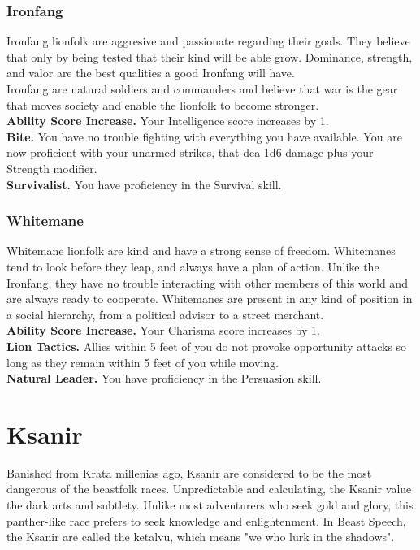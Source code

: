 \documentclass[10pt,twoside,twocolumn,openany]{book}
\begin{document}
\subsubsection{Ironfang}

Ironfang lionfolk are aggresive and passionate regarding their goals. They believe that only by being tested that their kind will be able grow. Dominance, strength, and valor are the best qualities a good Ironfang will have. \\
Ironfang are natural soldiers and commanders and believe that war is the gear that moves society and enable the lionfolk to become stronger.\\
\indent \textbf{Ability Score Increase.} Your Intelligence score increases by 1.\\
\indent \textbf{Bite.} You have no trouble fighting with everything you have available. You are now proficient with your unarmed strikes, that dea 1d6 damage plus your Strength modifier.\\
\indent \textbf{Survivalist.} You have proficiency in the Survival skill.
\subsubsection{Whitemane}
Whitemane lionfolk are kind and have a strong sense of freedom. Whitemanes tend to look before they leap, and always have a plan of action. Unlike the Ironfang, they have no trouble interacting with other members of this world and are always ready to cooperate. Whitemanes are present in any kind of position in a social hierarchy, from a political advisor to a street merchant.\\
\indent \textbf{Ability Score Increase.} Your Charisma score increases by 1.\\
\indent \textbf{Lion Tactics.} Allies within 5 feet of you do not provoke opportunity attacks so long as they remain within 5 feet of you while moving.\\
\indent \textbf{Natural Leader.} You have proficiency in the Persuasion skill.

\newpage

\section{Ksanir}

Banished from Krata millenias ago, Ksanir are considered to be the most dangerous of the beastfolk races. Unpredictable and calculating, the Ksanir value the dark arts and subtlety. Unlike most adventurers who seek gold and glory, this panther-like race prefers to seek knowledge and enlightenment. In Beast Speech, the Ksanir are called the ketalvu, which means "we who lurk in the shadows". 
\end{document}
